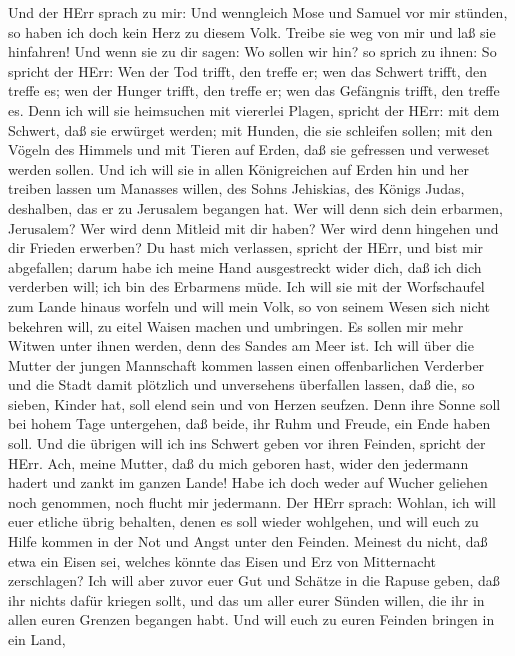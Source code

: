  Und der HErr sprach zu mir: Und wenngleich Mose und Samuel
vor mir stünden, so haben ich doch kein Herz zu diesem Volk. Treibe sie
weg von mir und laß sie hinfahren!  Und wenn sie zu dir
sagen: Wo sollen wir hin? so sprich zu ihnen: So spricht der HErr: Wen
der Tod trifft, den treffe er; wen das Schwert trifft, den treffe es;
wen der Hunger trifft, den treffe er; wen das Gefängnis trifft, den
treffe es.  Denn ich will sie heimsuchen mit viererlei
Plagen, spricht der HErr: mit dem Schwert, daß sie erwürget werden; mit
Hunden, die sie schleifen sollen; mit den Vögeln des Himmels und mit
Tieren auf Erden, daß sie gefressen und verweset werden sollen.
 Und ich will sie in allen Königreichen auf Erden hin und
her treiben lassen um Manasses willen, des Sohns Jehiskias, des Königs
Judas, deshalben, das er zu Jerusalem begangen hat.  Wer
will denn sich dein erbarmen, Jerusalem? Wer wird denn Mitleid mit dir
haben? Wer wird denn hingehen und dir Frieden erwerben?  Du
hast mich verlassen, spricht der HErr, und bist mir abgefallen; darum
habe ich meine Hand ausgestreckt wider dich, daß ich dich verderben
will; ich bin des Erbarmens müde.  Ich will sie mit der
Worfschaufel zum Lande hinaus worfeln und will mein Volk, so von seinem
Wesen sich nicht bekehren will, zu eitel Waisen machen und umbringen.
 Es sollen mir mehr Witwen unter ihnen werden, denn des
Sandes am Meer ist. Ich will über die Mutter der jungen Mannschaft
kommen lassen einen offenbarlichen Verderber und die Stadt damit
plötzlich und unversehens überfallen lassen,  daß die, so
sieben, Kinder hat, soll elend sein und von Herzen seufzen. Denn ihre
Sonne soll bei hohem Tage untergehen, daß beide, ihr Ruhm und Freude,
ein Ende haben soll. Und die übrigen will ich ins Schwert geben vor
ihren Feinden, spricht der HErr.  Ach, meine Mutter, daß du
mich geboren hast, wider den jedermann hadert und zankt im ganzen Lande!
Habe ich doch weder auf Wucher geliehen noch genommen, noch flucht mir
jedermann.  Der HErr sprach: Wohlan, ich will euer etliche
übrig behalten, denen es soll wieder wohlgehen, und will euch zu Hilfe
kommen in der Not und Angst unter den Feinden.  Meinest du
nicht, daß etwa ein Eisen sei, welches könnte das Eisen und Erz von
Mitternacht zerschlagen?  Ich will aber zuvor euer Gut und
Schätze in die Rapuse geben, daß ihr nichts dafür kriegen sollt, und das
um aller eurer Sünden willen, die ihr in allen euren Grenzen begangen
habt.  Und will euch zu euren Feinden bringen in ein Land,
